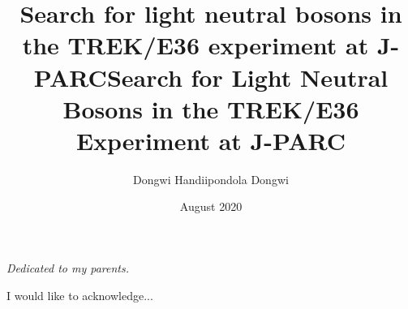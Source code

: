 \documentclass[12]{hamptondissertation-s}
\author{Dongwi Handiipondola Dongwi}
\date{August 2020}
\title{Search for light neutral bosons in the TREK/E36 experiment at J-PARC}
\numberwithin{equation}{section}
\begin{document}



\frontmatter

\maketitle


\cleardoublepage

\makesignature

\copyrightpage[2020]
\title{Search for Light Neutral Bosons in the TREK/E36 Experiment at J-PARC}




\begin{dedication}
\centerline{\emph{Dedicated to my parents.}}
\end{dedication}

\begin{Acknowledgements}
 I would like to acknowledge...
\end{Acknowledgements}

\tableofcontents

\listoftables

\listoffigures




\mainmatter

%   
%          
%
%





%
%

\begin{VITA}
% 
\end{VITA}
\end{document}
